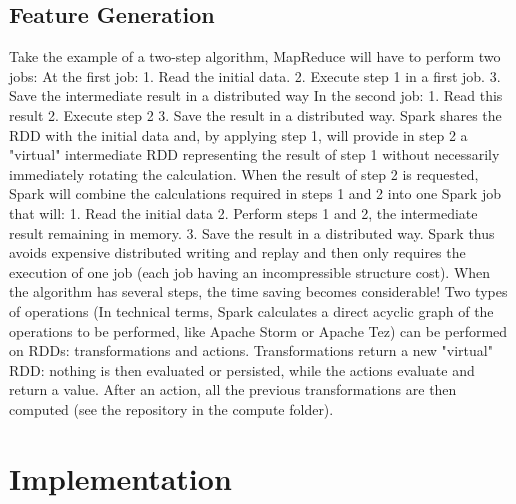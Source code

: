 \documentclass{acmtog} %
\begin{document}
\subsection{Feature Generation}
\label{subsub:featureGeneration}

Take the example of a two-step algorithm, MapReduce will have to perform two jobs:
At the first job:
1.	Read the initial data.
2.	Execute step 1 in a first job.
3.	Save the intermediate result in a distributed way
In the second job:
1.	Read this result
2.	Execute step 2
3.	Save the result in a distributed way.
Spark shares the RDD with the initial data and, by applying step 1, will provide in step 2 a "virtual" intermediate RDD representing the result of step 1 without necessarily immediately rotating the calculation. When the result of step 2 is requested, Spark will combine the calculations required in steps 1 and 2 into one Spark job that will:
1.	Read the initial data
2.	Perform steps 1 and 2, the intermediate result remaining in memory.
3.	Save the result in a distributed way.
Spark thus avoids expensive distributed writing and replay and then only requires the execution of one job (each job having an incompressible structure cost).
When the algorithm has several steps, the time saving becomes considerable!
Two types of operations (In technical terms, Spark calculates a direct acyclic graph of the operations to be performed, like Apache Storm or Apache Tez) can be performed on RDDs: transformations and actions. Transformations return a new "virtual" RDD: nothing is then evaluated or persisted, while the actions evaluate and return a value. After an action, all the previous transformations are then computed (see the repository in the compute folder).

\section{Implementation}
\label{sec:implementation}
\end{document}
